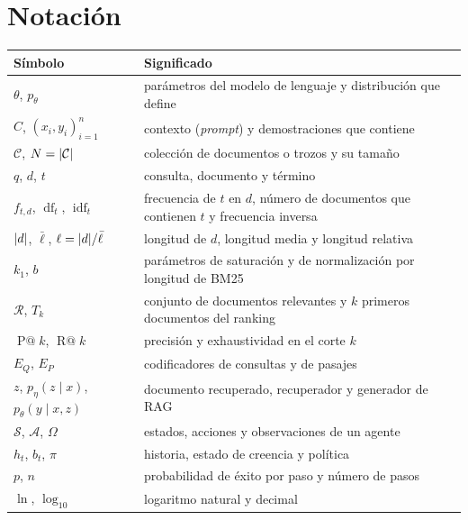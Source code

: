 \documentclass[11pt,a4paper,twoside,openany]{book}
\makeatletter
\newcommand{\idf}{\operatorname{idf}}
\newcommand{\df}{\operatorname{df}}
\newcommand{\Pk}[1]{\operatorname{P@}#1}
\newcommand{\Rk}[1]{\operatorname{R@}#1}
\newcommand{\Col}{\mathcal{C}}
\newcommand{\Rel}{\mathcal{R}}
\makeatother
\begin{document}
\section*{Notación}
\begin{center}\small
\begin{tabularx}{\textwidth}{@{}l>{\raggedright\arraybackslash}X@{}}
\toprule
Símbolo & Significado \\
\midrule
$\theta$, $p_\theta$ & parámetros del modelo de lenguaje y distribución que define \\
$C$, $(x_i,y_i)_{i=1}^{n}$ & contexto (\emph{prompt}) y demostraciones que contiene \\
$\Col$, $N=\abs{\Col}$ & colección de documentos o trozos y su tamaño \\
$q$, $d$, $t$ & consulta, documento y término \\
$f_{t,d}$, $\df_t$, $\idf_t$ & frecuencia de $t$ en $d$, número de documentos que contienen $t$ y frecuencia inversa \\
$\lvert d\rvert$, $\bar\ell$, $\ell=\lvert d\rvert/\bar\ell$ & longitud de $d$, longitud media y longitud relativa \\
$k_1$, $b$ & parámetros de saturación y de normalización por longitud de BM25 \\
$\Rel$, $T_k$ & conjunto de documentos relevantes y $k$ primeros documentos del ranking \\
$\Pk{k}$, $\Rk{k}$ & precisión y exhaustividad en el corte $k$ \\
$E_Q$, $E_P$ & codificadores de consultas y de pasajes \\
$z$, $p_\eta(z\mid x)$, $p_\theta(y\mid x,z)$ & documento recuperado, recuperador y generador de RAG \\
$\mathcal{S}$, $\mathcal{A}$, $\Omega$ & estados, acciones y observaciones de un agente \\
$h_t$, $b_t$, $\pi$ & historia, estado de creencia y política \\
$p$, $n$ & probabilidad de éxito por paso y número de pasos \\
$\ln$, $\log_{10}$ & logaritmo natural y decimal \\
\bottomrule
\end{tabularx}
\end{center}


\tableofcontents

\mainmatter







\backmatter

\end{document}
